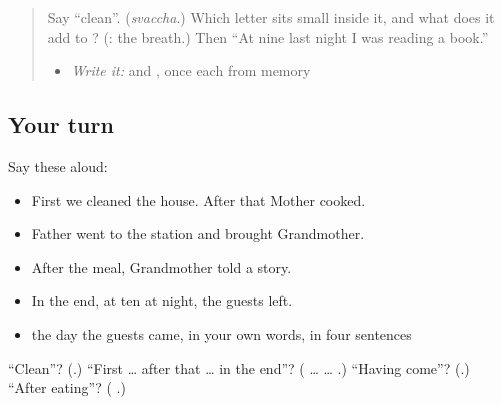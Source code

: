 \label{lesson:KA-R310-a-story-in-order}



\begin{quote}
Say \textquotedblleft{}clean\textquotedblright{}. (\emph{svaccha}.) Which letter sits small inside it, and what does it add to \textbf{}? (\textbf{}: the breath.) Then \textquotedblleft{}At nine last night I was reading a book.\textquotedblright{}

\begin{itemize}
\raggedright
  \item \emph{Write it:} \textbf{} and \textbf{}, once each from memory
\end{itemize}
\end{quote}

\subsection*{Your turn}
Say these aloud:

\begin{itemize}
\raggedright
  \item First we cleaned the house. After that Mother cooked.
  \item Father went to the station and brought Grandmother.
  \item After the meal, Grandmother told a story.
  \item In the end, at ten at night, the guests left.
  \item the day the guests came, in your own words, in four sentences
\end{itemize}

\begin{tcolorbox}[breakable,colback=teal!4,colframe=teal!35!black,title={Before you move on}]
\textquotedblleft{}Clean\textquotedblright{}? (\textbf{}.) \textquotedblleft{}First … after that … in the end\textquotedblright{}? (\textbf{} … \textbf{ } … \textbf{}.) \textquotedblleft{}Having come\textquotedblright{}? (\textbf{}.) \textquotedblleft{}After eating\textquotedblright{}? (\textbf{  }.)
\end{tcolorbox}
